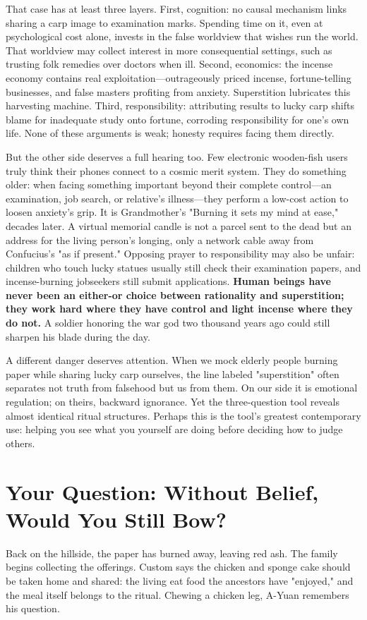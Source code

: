 That case has at least three layers. First, cognition: no causal mechanism links sharing a carp image to examination marks. Spending time on it, even at psychological cost alone, invests in the false worldview that wishes run the world. That worldview may collect interest in more consequential settings, such as trusting folk remedies over doctors when ill. Second, economics: the incense economy contains real exploitation---outrageously priced incense, fortune-telling businesses, and false masters profiting from anxiety. Superstition lubricates this harvesting machine. Third, responsibility: attributing results to lucky carp shifts blame for inadequate study onto fortune, corroding responsibility for one's own life. None of these arguments is weak; honesty requires facing them directly.

But the other side deserves a full hearing too. Few electronic wooden-fish users truly think their phones connect to a cosmic merit system. They do something older: when facing something important beyond their complete control---an examination, job search, or relative's illness---they perform a low-cost action to loosen anxiety's grip. It is Grandmother's "Burning it sets my mind at ease," decades later. A virtual memorial candle is not a parcel sent to the dead but an address for the living person's longing, only a network cable away from Confucius's "as if present." Opposing prayer to responsibility may also be unfair: children who touch lucky statues usually still check their examination papers, and incense-burning jobseekers still submit applications. \textbf{Human beings have never been an either-or choice between rationality and superstition; they work hard where they have control and light incense where they do not.} A soldier honoring the war god two thousand years ago could still sharpen his blade during the day.

A different danger deserves attention. When we mock elderly people burning paper while sharing lucky carp ourselves, the line labeled "superstition" often separates not truth from falsehood but us from them. On our side it is emotional regulation; on theirs, backward ignorance. Yet the three-question tool reveals almost identical ritual structures. Perhaps this is the tool's greatest contemporary use: helping you see what you yourself are doing before deciding how to judge others.

\section[Without Belief, Would You Still Bow?]{Your Question: Without Belief, Would You Still Bow?}
Back on the hillside, the paper has burned away, leaving red ash. The family begins collecting the offerings. Custom says the chicken and sponge cake should be taken home and shared: the living eat food the ancestors have "enjoyed," and the meal itself belongs to the ritual. Chewing a chicken leg, A-Yuan remembers his question.

